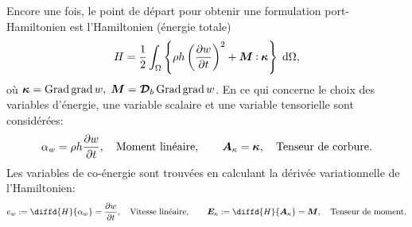 Encore une fois, le point de départ pour obtenir une formulation port-Hamiltonien est l'Hamiltonien (énergie totale)
\begin{equation*}
H = \frac{1}{2} \int_{\Omega} \left\{\rho h \left(\diffp{w}{t} \right)^2 + \bm{M} \cddot \bm{\kappa}  \right\}  \d{\Omega},
\end{equation*}
où $ \bm{\kappa} = \operatorname*{Grad}\operatorname*{grad}{w}, \; \bm{M} = \bm{\mathcal{D}}_b \operatorname*{Grad}\operatorname*{grad}{w}$. En ce qui concerne le choix des variables d'énergie, une variable scalaire et une variable tensorielle sont considérées:
\begin{equation*}
\alpha_w = \rho h \diffp{w}{t}, \quad \text{Moment linéaire}, \qquad \bm{A}_{\kappa} = \bm{\kappa}, \quad \text{Tenseur de corbure}.	
\end{equation*}
Les variables de co-énergie sont trouvées en calculant la dérivée variationnelle de l'Hamiltonien:
\begin{equation*}
e_w := \diffd{H}{\alpha_w} = \diffp{w}{t}, \quad \text{Vitesse linéaire},  \qquad  \bm{E}_{\kappa} := \diffd{H}{\bm{A}_{\kappa}} = \bm{M}, \quad \text{Tenseur de moment}.
\end{equation*}

